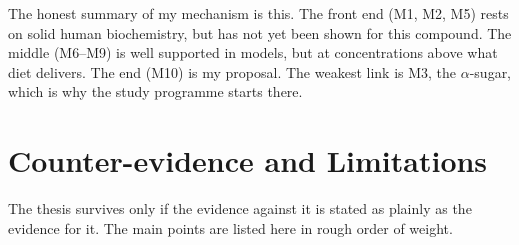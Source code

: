 \documentclass[11pt,a4paper]{article}
\begin{document}
\noindent The honest summary of my mechanism is this. The front end (M1, M2, M5) rests on solid human biochemistry, but has not yet been shown for this compound. The middle (M6--M9) is well supported in models, but at concentrations above what diet delivers. The end (M10) is my proposal. The weakest link is M3, the $\alpha$-sugar, which is why the study programme starts there.

\section{Counter-evidence and Limitations}
\label{sec:counter}

The thesis survives only if the evidence against it is stated as plainly as the evidence for it. The main points are listed here in rough order of weight.
\end{document}
